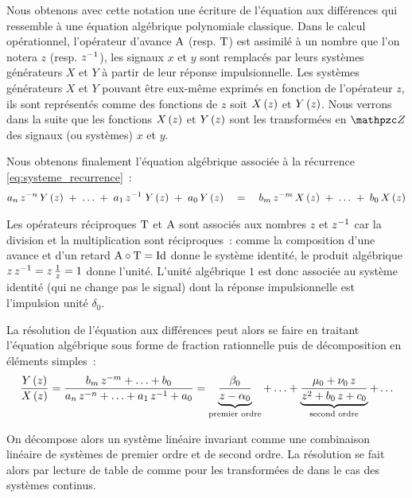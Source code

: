 Nous obtenons avec cette notation une écriture de l'équation aux
différences qui ressemble à une équation algébrique polynomiale
classique. Dans le calcul opérationnel, l'opérateur d'avance
$\mathrm{A}$ (resp. $\mathrm{T}$) est assimilé à un nombre que l'on notera
$z$ (resp. $z^{-1}$), les signaux $x$ et $y$ sont remplacés par leurs
systèmes générateurs $X$ et $Y$ à partir de leur réponse
impulsionnelle. Les systèmes générateurs $X$ et $Y$ pouvant être
eux-même exprimés en fonction de l'opérateur $z$, ils sont représentés
comme des fonctions de $z$ soit $X\left(z\right)$ et $Y\left(z\right)$. Nous verrons
dans la suite que les fonctions $X\left(z\right)$ et $Y\left(z\right)$ sont les
transformées en $\TZ$ des signaux (ou systèmes) $x$ et $y$.

Nous obtenons finalement l'équation algébrique associée à la récurrence
\eqref{eq:systeme_recurrence}~:
\begin{eqnarray}
  \label{eq:systeme_algebrique}
  a_n\,z^{-n}\,Y\left(z\right)\; +\; \ldots \;+\; a_1\,z^{-1}\;Y\left(z\right) \;+\; a_0\,Y\left(z\right) \quad  = \quad b_m\,z^{-m}\,X\left(z\right) \;+\; \ldots \;+\; b_0\,X\left(z\right)
\end{eqnarray}

Les opérateurs réciproques $\mathrm{T}$ et $\mathrm{A}$ sont associés aux
nombres $z$ et $z^{-1}$ car la division et la multiplication sont
réciproques~: comme la composition d'une avance et d'un retard
$\mathrm{A} \circ \mathrm{T} = \mathrm{Id}$ donne le système identité, le produit
algébrique $z\,z^{-1}=z\,\frac{1}{z}=1$ donne l'unité. L'unité
algébrique $1$ est donc associée au \og{}système identité \fg{} (qui
ne change pas le signal) dont la réponse impulsionnelle est
l'impulsion unité $\delta_0$.

La résolution de l'équation aux différences peut alors se faire en
traitant l'équation algébrique sous forme de fraction rationnelle puis
de décomposition en éléments simples~:
\begin{eqnarray}
 \frac{Y\left(z\right)}{X\left(z\right)} = \frac{b_m\,z^{-m} + \ldots + b_0}{a_n\,z^{-n}+ \ldots +  a_1\,z^{-1} + a_0} = \underbrace{\frac{\beta_0}{z-\alpha_0}}_{\text{premier ordre}} + \ldots + \underbrace{\frac{\mu_0+\nu_0\,z}{z^2+b_0\,z+c_0}}_{\text{second ordre}} + \ldots
\end{eqnarray}

On décompose alors un système linéaire invariant comme une combinaison
linéaire de systèmes de premier ordre et de second ordre. La
résolution se fait alors par lecture de table de \teZ{} comme pour les
transformées de \Laplace{} dans le cas des systèmes continus.

